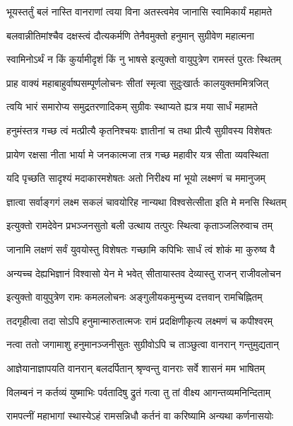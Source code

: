 \twolineshloka
{भूयस्तर्तुं बलं नास्ति वानराणां त्वया विना}
{अतस्त्वमेव जानासि स्वामिकार्यं महामते} %

\twolineshloka
{बलवान्नीतिमांश्चैव दक्षस्त्वं दौत्यकर्मणि}
{तेनैवमुक्तो हनुमान् सुग्रीवेण महात्मना} %

\twolineshloka
{स्वामिनोऽर्थं न किं कुर्यामीदृशं किं नु भाषसे}
{इत्युक्तो वायुपुत्रेण रामस्तं पुरतः स्थितम्} %

\twolineshloka
{प्राह वाक्यं महाबाहुर्वाष्पसम्पूर्णलोचनः}
{सीतां स्मृत्वा सुदुःखार्तः कालयुक्तममित्रजित्} %

\twolineshloka
{त्वयि भारं समारोप्य समुद्रतरणादिकम्}
{सुग्रीवः स्थाप्यते ह्यत्र मया सार्धं महामते} %

\twolineshloka
{हनुमंस्तत्र गच्छ त्वं मत्प्रीत्यै कृतनिश्चयः}
{ज्ञातीनां च तथा प्रीत्यै सुग्रीवस्य विशेषतः} %

\twolineshloka
{प्रायेण रक्षसा नीता भार्या मे जनकात्मजा}
{तत्र गच्छ महावीर यत्र सीता व्यवस्थिता} %

\twolineshloka
{यदि पृच्छति सादृश्यं मदाकारमशेषतः}
{अतो निरीक्ष्य मां भूयो लक्ष्मणं च ममानुजम्} %

\twolineshloka
{ज्ञात्वा सर्वाङ्गगं लक्ष्म सकलं चावयोरिह}
{नान्यथा विश्वसेत्सीता इति मे मनसि स्थितम्} %

\twolineshloka
{इत्युक्तो रामदेवेन प्रभञ्जनसुतो बली}
{उत्थाय तत्पुरः स्थित्वा कृताञ्जलिरुवाच तम्} %

\twolineshloka
{जानामि लक्षणं सर्वं युवयोस्तु विशेषतः}
{गच्छामि कपिभिः सार्धं त्वं शोकं मा कुरुष्व वै} %

\twolineshloka
{अन्यच्च देह्यभिज्ञानं विश्वासो येन मे भवेत्}
{सीतायास्तव देव्यास्तु राजन् राजीवलोचन} %

\twolineshloka
{इत्युक्तो वायुपुत्रेण रामः कमललोचनः}
{अङ्गुलीयकमुन्मुच्य दत्तवान् रामचिह्नितम्} %

\twolineshloka
{तदगृहीत्वा तदा सोऽपि हनुमान्मारुतात्मजः}
{रामं प्रदक्षिणीकृत्य लक्ष्मणं च कपीश्वरम्} %

\twolineshloka
{नत्वा ततो जगामाशु हनुमानञ्जनीसुतः}
{सुग्रीवोऽपि च ताञ्छुत्वा वानरान् गन्तुमुद्यतान्} %

\twolineshloka
{आज्ञेयानाज्ञापयति वानरान् बलदर्पितान्}
{श्रृण्वन्तु वानराः सर्वे शासनं मम भाषितम्} %

\twolineshloka
{विलम्बनं न कर्तव्यं युष्माभिः पर्वतादिषु}
{द्रुतं गत्वा तु तां वीक्ष्य आगन्तव्यमनिन्दिताम्} %

\twolineshloka
{रामपत्नीं महाभागां स्थास्येऽहं रामसन्निधौ}
{कर्तनं वा करिष्यामि अन्यथा कर्णनासयोः} %


